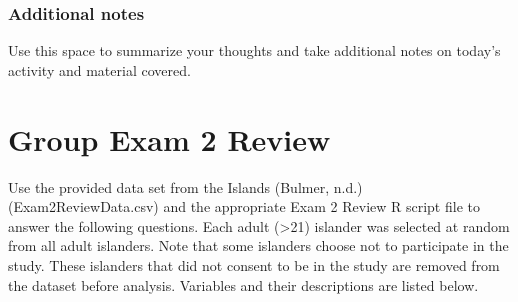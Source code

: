 \documentclass[
]{report}
\begin{document}
\hypertarget{additional-notes-17}{%
\subsection{Additional notes}\label{additional-notes-17}}

Use this space to summarize your thoughts and take additional notes on today's activity and material covered.

\newpage

\hypertarget{group-exam-2-review}{%
\chapter{Group Exam 2 Review}\label{group-exam-2-review}}

Use the provided data set from the Islands (Bulmer, n.d.) (Exam2ReviewData.csv) and the appropriate Exam 2 Review R script file to answer the following questions. Each adult (\textgreater21) islander was selected at random from all adult islanders. Note that some islanders choose not to participate in the study. These islanders that did not consent to be in the study are removed from the dataset before analysis. Variables and their descriptions are listed below.
\end{document}
